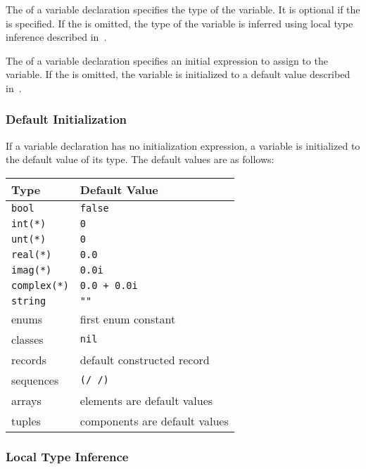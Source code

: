 The  of a variable declaration specifies the type of
the variable.  It is optional if the  is
specified.  If the  is omitted, the type of the
variable is inferred using local type inference described
in~.

The  of a variable declaration specifies an
initial expression to assign to the variable.  If
the  is omitted, the variable is initialized
to a default value described in~.

\subsubsection{Default Initialization}
\label{Default_Initialization}

If a variable declaration has no initialization expression, a variable
is initialized to the default value of its type.  The default values
are as follows:
\begin{center}
\begin{tabular}{|l|l|}
\hline
{\bf Type} & {\bf Default Value} \\
\hline
{\tt bool} & {\tt false} \\
{\tt int(*)} & {\tt 0} \\
{\tt unt(*)} & {\tt 0} \\
{\tt real(*)} & {\tt 0.0} \\
{\tt imag(*)} & {\tt 0.0i} \\
{\tt complex(*)} & {\tt 0.0 + 0.0i} \\
{\tt string} & {\tt ""} \\
enums & first enum constant \\
classes & {\tt nil} \\
records & default constructed record \\
sequences & {\tt (/ /)} \\
arrays & elements are default values \\
tuples & components are default values \\
\hline
\end{tabular}
\end{center}

\subsubsection{Local Type Inference}
\label{Local_Type_Inference}

